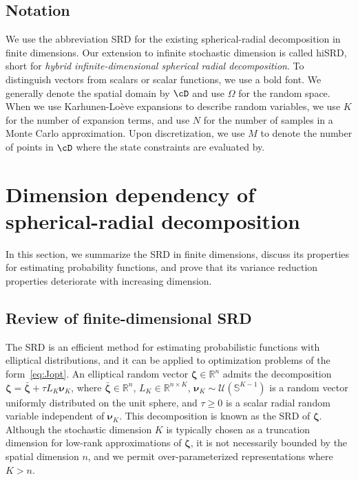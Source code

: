 \documentclass[%
onefignum,onetabnum]{siamonline250211}
\newcommand{\bbR}{\mathbb R}
\newcommand{\bbS}{\mathbb S}
\newcommand{\cU}{\mathcal U} \newcommand{\cV}{\mathcal V}
\newcommand{\hiSRD}{{\sc hiSRD}}
\begin{document}
\subsection{Notation}
We use the abbreviation SRD for the existing spherical-radial decomposition in finite dimensions. Our extension to infinite stochastic dimension is called \hiSRD, short for \emph{hybrid infinite-dimensional spherical radial decomposition}.
To distinguish vectors from scalars or scalar functions, we use a bold font. We generally denote the spatial domain by $\cD$ and use $\Omega$ for the random space. 
When we use Karhunen-Lo\`eve expansions to describe random variables, we use $K$ for the number of expansion terms, and use $N$ for the number of samples in a Monte Carlo approximation. Upon discretization, we use $M$ to denote the number of points in $\cD$ where the state constraints are evaluated by.



\section{Dimension dependency of spherical-radial decomposition}
In this section, we summarize the SRD in finite dimensions, discuss its properties for estimating probability functions, and prove that its variance reduction properties deteriorate with increasing dimension.

\subsection{Review of finite-dimensional SRD}\label{subsec:finite-dim-SRD}
The SRD is an efficient method for estimating probabilistic functions with elliptical distributions, and it can be applied to optimization problems of the form~\eqref{eq:Jopt}. An elliptical random vector $\boldsymbol{\zeta} \in \bbR^n$ admits the decomposition
$\boldsymbol{\zeta} = \bar{\boldsymbol{\zeta}} + \tau L_K \boldsymbol{\nu}_K$,
where $\bar{\boldsymbol{\zeta}} \in \bbR^n$, $L_K \in \bbR^{n \times K}$, $\boldsymbol{\nu}_K \sim \cU(\bbS^{K-1})$ is a random vector uniformly distributed on the unit sphere, and $\tau\geq 0$ is a scalar radial random variable independent of $\boldsymbol{\nu}_K$. This decomposition is known as the SRD of $\boldsymbol{\zeta}$. Although the stochastic dimension $K$ is typically chosen as a truncation dimension for low-rank approximations of $\boldsymbol{\zeta}$,
it is not necessarily bounded by the spatial dimension $n$, and we permit over-parameterized representations where $K>n$.
\end{document}
